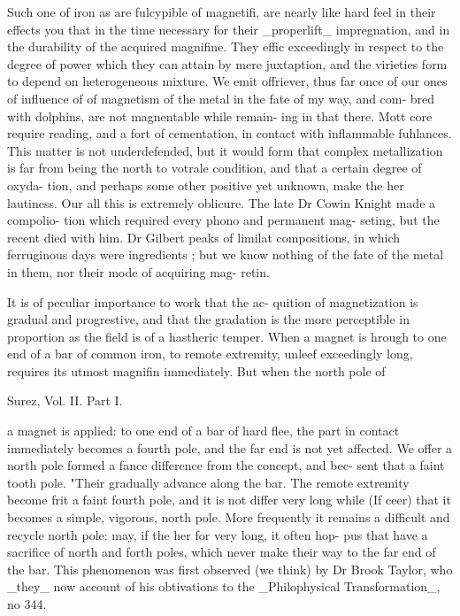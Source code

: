 \documentclass{article}
\begin{document}
Such one of iron as are fulcypible of magnetifi,
are nearly like hard feel in their effects you that in
the time necessary for their \_properlift\_ impregnation, and
in the durability of the acquired magnifine. They
effic exceedingly in respect to the degree of power
which they can attain by mere juxtaption, and the
virieties form to depend on heterogeneous mixture.
We emit offriever, thus far once of our ones of influence of
of magnetism of the metal in the fate of my way, and com-
bred with dolphins, are not magnentable while remain-
ing in that there. Mott core require reading, and a fort
of cementation, in contact with inflammable fuhlances.
This matter is not underdefended, but it would form
that complex metallization is far from being the north to
votrale condition, and that a certain degree of oxyda-
tion, and perhaps some other positive yet unknown,
make the her lautiness. Our all this is extremely
oblicure. The late Dr Cowin Knight made a compolio-
tion which required every phono and permanent mag-
seting, but the recent died with him. Dr Gilbert
peaks of limilat compositions, in which ferruginous
days were ingredients ; but we know nothing of the fate
of the metal in them, nor their mode of acquiring mag-
retin.

It is of peculiar importance to work that the ac-
quition of magnetization is gradual and progrestive, and
that the gradation is the more perceptible in proportion
as the field is of a hastheric temper. When a magnet is
hrough to one end of a bar of common iron, to remote
extremity, unleef exceedingly long, requires its utmost
magnifin immediately. But when the north pole of

Surez, Vol. II. Part I.

a magnet is applied: to one end of a bar of hard flee,
the part in contact immediately becomes a fourth pole,
and the far end is not yet affected. We offer a north
pole formed a fance difference from the concept, and bec-
sent that a faint tooth pole. "Their gradually advance
along the bar. The remote extremity become frit a
faint fourth pole, and it is not differ very long while
(If ceer) that it becomes a simple, vigorous, north
pole. More frequently it remains a difficult and recycle
north pole: may, if the her for very long, it often hop-
pus that have a sacrifice of north and forth poles,
which never make their way to the far end of the bar.
This phenomenon was first observed (we think) by Dr
Brook Taylor, who \_they\_ now account of his obtivations
to the \_Philophysical Transformation\_, no 344.
\end{document}
